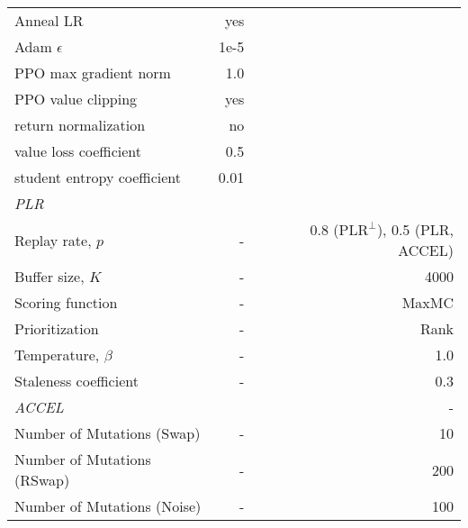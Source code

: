 \documentclass{article}
\theoremstyle{plain}
\theoremstyle{definition}
\theoremstyle{remark}
\begin{document}
\begin{table}[H]
\begin{center}
{\begin{tabular}{lrr}
        Anneal LR                       & yes       &           \\
        Adam $\epsilon$                 & 1e-5      &           \\
        PPO max gradient norm           & 1.0       &           \\
        PPO value clipping              & yes       &           \\
        return normalization            & no        &           \\
        value loss coefficient          & 0.5       &           \\
        student entropy coefficient     & 0.01      &           \\
        \emph{PLR}                      &           &           \\
        Replay rate, $p$                & -         & 0.8 ($\text{PLR}^\perp$), 0.5 (PLR, ACCEL)       \\
        Buffer size, $K$                & -         & 4000      \\
        Scoring function                & -         & MaxMC     \\
        Prioritization                  & -         & Rank      \\
        Temperature, $\beta$            & -         & 1.0       \\
        Staleness coefficient           & -         & 0.3       \\
        \emph{ACCEL}                    &           & -         \\
        Number of Mutations (Swap)      & -         & 10         \\
        Number of Mutations (RSwap)     & -         & 200         \\
        Number of Mutations (Noise)     & -         & 100         \\
        \bottomrule 

\end{tabular}}
\end{center}
\end{table}
\end{document}
